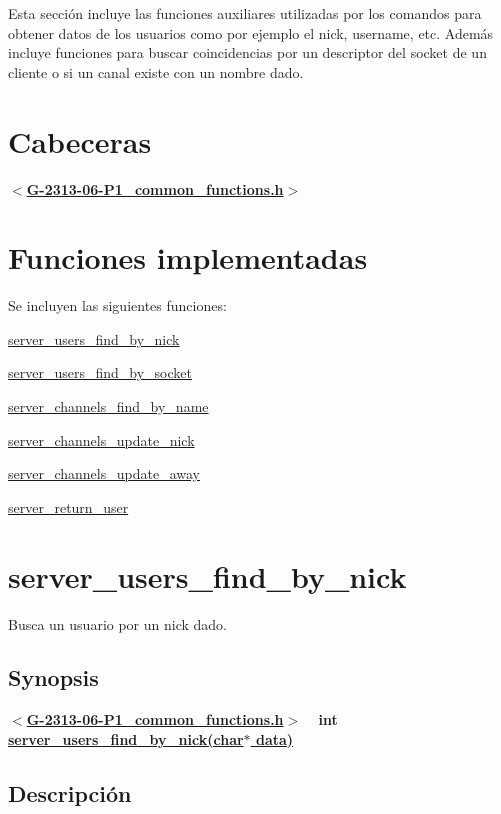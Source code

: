 Esta sección incluye las funciones auxiliares utilizadas por los comandos para obtener datos de los usuarios como por ejemplo el nick, username, etc. Además incluye funciones para buscar coincidencias por un descriptor del socket de un cliente o si un canal existe con un nombre dado.\hypertarget{server_common_functions_cabeceras2}{}\section{Cabeceras}\label{server_common_functions_cabeceras2}
{ {\bfseries $<$\hyperlink{G-2313-06-P1__common__functions_8h}{G-\/2313-\/06-\/\+P1\+\_\+common\+\_\+functions.\+h}$>$} } \hypertarget{server_common_functions_functions2}{}\section{Funciones implementadas}\label{server_common_functions_functions2}
Se incluyen las siguientes funciones\+: 
\begin{DoxyItemize}
\item \hyperlink{server_users_find_by_nick}{server\+\_\+users\+\_\+find\+\_\+by\+\_\+nick} 
\item \hyperlink{server_users_find_by_socket}{server\+\_\+users\+\_\+find\+\_\+by\+\_\+socket} 
\item \hyperlink{server_channels_find_by_name}{server\+\_\+channels\+\_\+find\+\_\+by\+\_\+name} 
\item \hyperlink{server_channels_update_nick}{server\+\_\+channels\+\_\+update\+\_\+nick} 
\item \hyperlink{server_channels_update_away}{server\+\_\+channels\+\_\+update\+\_\+away} 
\item \hyperlink{server_return_user}{server\+\_\+return\+\_\+user} 
\end{DoxyItemize}\hypertarget{server_users_find_by_nick}{}\section{server\+\_\+users\+\_\+find\+\_\+by\+\_\+nick}\label{server_users_find_by_nick}
Busca un usuario por un nick dado.\hypertarget{server_users_find_by_nick_synopsis_server_users_find_by_nick}{}\subsection{Synopsis}\label{server_users_find_by_nick_synopsis_server_users_find_by_nick}
{ {\bfseries $<$\hyperlink{G-2313-06-P1__common__functions_8h}{G-\/2313-\/06-\/\+P1\+\_\+common\+\_\+functions.\+h}$>$} ~\newline
 {\bfseries int \hyperlink{G-2313-06-P1__common__functions_8c_a61cca6f1a1adeb81f722ecc2ff35aab5}{server\+\_\+users\+\_\+find\+\_\+by\+\_\+nick(char$\ast$ data)}} } \hypertarget{server_users_find_by_nick_descripcion_server_users_find_by_nick}{}\subsection{Descripción}\label{server_users_find_by_nick_descripcion_server_users_find_by_nick}
